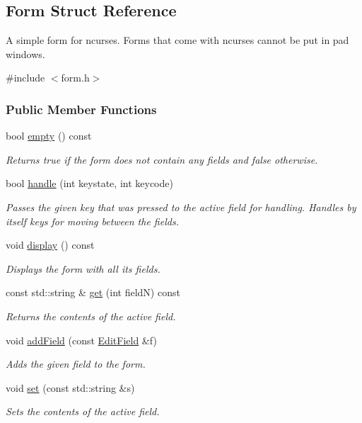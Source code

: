 \hypertarget{structForm}{}\subsection{Form Struct Reference}
\label{structForm}


A simple form for ncurses. Forms that come with {\ttfamily ncurses} cannot be put in pad windows.  




{\ttfamily \#include $<$form.\+h$>$}

\subsubsection*{Public Member Functions}
\begin{DoxyCompactItemize}
\item 
bool \hyperlink{structForm_a11648b06059461e76df345fb17f5b7e1}{empty} () const 
\begin{DoxyCompactList}\small\item\em Returns {\ttfamily true} if the form does not contain any fields and {\ttfamily false} otherwise. \end{DoxyCompactList}\item 
bool \hyperlink{structForm_aacf83dfa15f559e2816513a1f2018cfe}{handle} (int keystate, int keycode)
\begin{DoxyCompactList}\small\item\em Passes the given key that was pressed to the active field for handling. Handles by itself keys for moving between the fields. \end{DoxyCompactList}\item 
void \hyperlink{structForm_a793cd7d07756b0cec92a01b86d9ff0b0}{display} () const \hypertarget{structForm_a793cd7d07756b0cec92a01b86d9ff0b0}{}\label{structForm_a793cd7d07756b0cec92a01b86d9ff0b0}

\begin{DoxyCompactList}\small\item\em Displays the form with all its fields. \end{DoxyCompactList}\item 
const std\+::string \& \hyperlink{structForm_a53a8b31b1668167bdc4ed7774ddd4dbe}{get} (int fieldN) const 
\begin{DoxyCompactList}\small\item\em Returns the contents of the active field. \end{DoxyCompactList}\item 
void \hyperlink{structForm_a2097df0fac065c1da36164880e310bcc}{add\+Field} (const \hyperlink{structEditField}{Edit\+Field} \&f)
\begin{DoxyCompactList}\small\item\em Adds the given field to the form. \end{DoxyCompactList}\item 
void \hyperlink{structForm_a4af904bbb87a907d6e0699c732967d43}{set} (const std\+::string \&s)
\begin{DoxyCompactList}\small\item\em Sets the contents of the active field. \end{DoxyCompactList}\end{DoxyCompactItemize}
